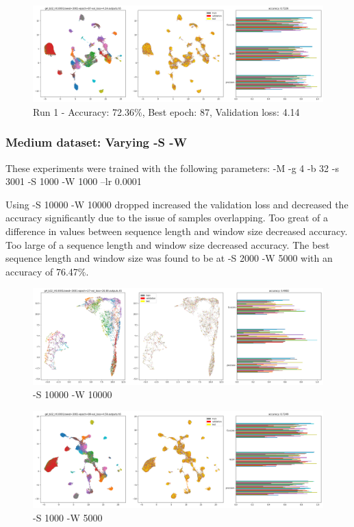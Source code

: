 \documentclass{article}
\begin{document}
\begin{figure}[h]
  \includegraphics[width=\linewidth]{new_journal/figures/experiments/roznet/medium/lr0.0001/run1.png}
  \caption{Run 1 - Accuracy: 72.36\%, Best epoch: 87, Validation loss: 4.14}
\end{figure}

\subsubsection*{Medium dataset: Varying -S -W}

These experiments were trained with the following parameters: \newline
-M -g 4 -b 32 -s 3001 -S 1000 -W 1000 --lr 0.0001

Using -S 10000 -W 10000 dropped increased the validation loss and decreased the accuracy significantly due to the issue of samples overlapping. Too great of a difference in values between sequence length and window size decreased accuracy. Too large of a sequence length and window size decreased accuracy. The best sequence length and window size was found to be at -S 2000 -W 5000 with an accuracy of 76.47\%.

\begin{figure}[h!]
  \includegraphics[width=\linewidth]{new_journal/figures/experiments/roznet/medium/S_W/10000_10000.png}
  \caption{-S 10000 -W 10000}
\end{figure}

\begin{figure}[h!]
  \includegraphics[width=\linewidth]{new_journal/figures/experiments/roznet/medium/S_W/1000_5000.png}
  \caption{-S 1000 -W 5000}
\end{figure}
\end{document}
